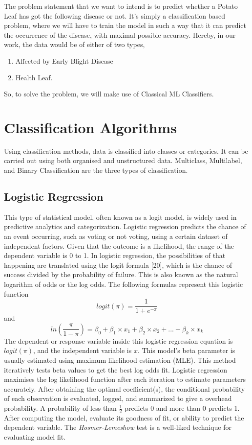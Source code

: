 \documentclass[conference]{IEEEtran}
\begin{document}
The problem statement that we want to intend is to predict whether a Potato Leaf has got the following disease or not. It's simply a classification based problem, where we will have to train the model in such a way that it can predict the occurrence of the disease, with maximal possible accuracy. Hereby, in our work, the data would be of either of two types,
\begin{enumerate}
\item Affected by Early Blight Disease
\item Health Leaf. 
\end{enumerate}
So, to solve the problem, we will make use of Classical ML Classifiers. 
\section{Classification Algorithms}
Using classification methods, data is classified into classes or categories. It can be carried out using both organised and unstructured data. Multiclass, Multilabel, and Binary Classification are the three types of classification.
\subsection{Logistic Regression}
This type of statistical model, often known as a logit model, is widely used in predictive analytics and categorization. Logistic regression predicts the chance of an event occurring, such as voting or not voting, using a certain dataset of independent factors. Given that the outcome is a likelihood, the range of the dependent variable is 0 to 1. In logistic regression, the possibilities of that happening are translated using the logit formula [20], which is the chance of success divided by the probability of failure. This is also known as the natural logarithm of odds or the log odds. The following formulas represent this logistic function
\begin{equation}
logit(\pi)=\frac{1}{1+e^{-\pi}}
\end{equation}
and
\begin{equation}
ln(\frac{\pi}{1-\pi}) = \beta_0 + \beta_1 \times x_1 + \beta_2 \times x_2 + ... + \beta_k \times x_k
\end{equation}
The dependent or response variable inside this logistic regression equation is $logit(\pi)$, and the independent variable is $x$. This model's beta parameter is usually estimated using maximum likelihood estimation (MLE). This method iteratively tests beta values to get the best log odds fit. Logistic regression maximises the log likelihood function after each iteration to estimate parameters accurately. After obtaining the optimal coefficient(s), the conditional probability of each observation is evaluated, logged, and summarized to give a overhead probability. A probability of less than $\frac{1}{2}$ predicts 0 and more than 0 predicts 1. After computing the model, evaluate its goodness of fit, or ability to predict the dependent variable. The \textit{Hosmer-Lemeshow} test is a well-liked technique for evaluating model fit.
\end{document}
